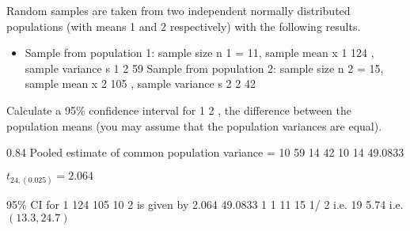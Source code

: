 \documentclass[a4paper,12pt]{article}
\begin{document}
Random samples are taken from two independent normally distributed populations
(with means 1 and 2 respectively) with the following results.
\begin{itemize}
    \item Sample from population 1:
sample size n 1 = 11, sample mean x 1 124 , sample variance s 1 2
59
Sample from population 2:
sample size n 2 = 15, sample mean x 2 105 , sample variance s 2 2
42
\end{itemize}

Calculate a 95\%  confidence interval for 1
2 , the difference between the
population means (you may assume that the population variances are equal).



0.84
Pooled estimate of common population variance =
10 59
14 42
10 14
49.0833

$t_{24, (0.025)} = 2.064$

95\%  CI for
1
124 105
10
2
is given by
2.064
49.0833
1 1
11 15
1/ 2
i.e. 19 5.74 i.e. $(13.3 , 24.7)$
\end{document}
